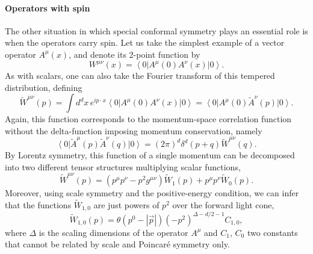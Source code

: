 \documentclass[a4paper,12pt]{article}
\newcommand{\ket}[1]{\left| #1 \right\rangle}
\newcommand{\bra}[1]{\left\langle #1 \right|}
\numberwithin{equation}{section}
\begin{document}
\paragraph{Operators with spin}

The other situation in which special conformal symmetry plays an essential role is when the operators carry spin.
Let us take the simplest example of a vector operator $A^\mu(x)$, and denote its 2-point function by
\begin{equation}
	W^{\mu\nu}(x) = \bra{0} A^\mu(0) A^\nu(x) \ket{0}.
\end{equation}
As with scalars, one can also take the Fourier transform of this tempered distribution, defining
\begin{equation}
	\widetilde{W}^{\mu\nu}(p) = \int d^dx \, e^{i p \cdot x}
	\bra{0} A^\mu(0) A^\nu(x) \ket{0}
	= \bra{0} A^\mu(0) \widetilde{A}^\nu(p) \ket{0}.
	\label{eq:vector:mixedrep}
\end{equation}
Again, this function corresponds to the momentum-space correlation function without the delta-function imposing momentum conservation, namely
\begin{equation}
	\bra{0} \widetilde{A}^\mu(p) \widetilde{A}^\nu(q) \ket{0}
	= (2\pi)^d \delta^d(p + q) \widetilde{W}^{\mu\nu}(q).
\end{equation}
By Lorentz symmetry, this function of a single momentum can be decomposed into two different tensor structures multiplying scalar functions,
\begin{equation}
	\widetilde{W}^{\mu\nu}(p)
	= (p^\mu p^\nu - p^2 g^{\mu\nu}) \widetilde{W}_1(p)
	+ p^\mu p^\nu \widetilde{W}_0(p).
	\label{eq:vector:polarizations}
\end{equation}
Moreover, using scale symmetry and the positive-energy condition, we can infer that the functions $\widetilde{W}_{1,0}$ are just powers of $p^2$ over the forward light cone,
\begin{equation}
	\widetilde{W}_{1,0}(p)
	= \theta\left( p^0 - \left| \vec{p} \right| \right)
	(-p^2)^{\Delta - d/2 - 1} C_{1,0},
\end{equation}
where $\Delta$ is the scaling dimensions of the operator $A^\mu$ and $C_1$, $C_0$ two constants that cannot be related by scale and Poincaré symmetry only.
\end{document}
